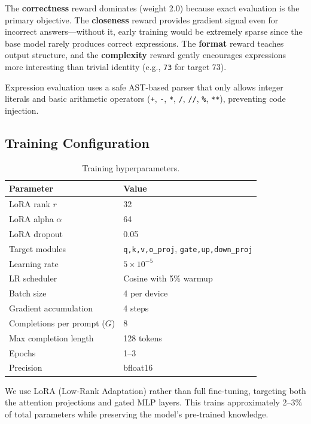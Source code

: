 \documentclass[11pt, letterpaper]{article}
\begin{document}
The \textbf{correctness} reward dominates (weight 2.0) because exact evaluation is the primary objective. The \textbf{closeness} reward provides gradient signal even for incorrect answers---without it, early training would be extremely sparse since the base model rarely produces correct expressions. The \textbf{format} reward teaches output structure, and the \textbf{complexity} reward gently encourages expressions more interesting than trivial identity (e.g., \texttt{73} for target 73).

Expression evaluation uses a safe AST-based parser that only allows integer literals and basic arithmetic operators (\texttt{+}, \texttt{-}, \texttt{*}, \texttt{/}, \texttt{//}, \texttt{\%}, \texttt{**}), preventing code injection.

\subsection{Training Configuration}

\begin{table}[H]
\centering
\caption{Training hyperparameters.}
\label{tab:hyperparams}
\begin{tabular}{ll}
\toprule
\textbf{Parameter} & \textbf{Value} \\
\midrule
LoRA rank $r$ & 32 \\
LoRA alpha $\alpha$ & 64 \\
LoRA dropout & 0.05 \\
Target modules & \texttt{q,k,v,o\_proj}, \texttt{gate,up,down\_proj} \\
Learning rate & $5 \times 10^{-5}$ \\
LR scheduler & Cosine with 5\% warmup \\
Batch size & 4 per device \\
Gradient accumulation & 4 steps \\
Completions per prompt ($G$) & 8 \\
Max completion length & 128 tokens \\
Epochs & 1--3 \\
Precision & bfloat16 \\
\bottomrule
\end{tabular}
\end{table}

We use LoRA \cite{lora} (Low-Rank Adaptation) rather than full fine-tuning, targeting both the attention projections and gated MLP layers. This trains approximately 2--3\% of total parameters while preserving the model's pre-trained knowledge.
\end{document}
